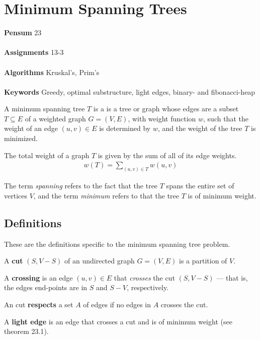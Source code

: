 
\chapter{Minimum Spanning Trees}
\label{ch:minimumspanningtrees}

\textbf{Pensum} 23 \cite{clrs} \\\\
\textbf{Assignments} 13-3 \\\\
\textbf{Algorithms} Kruskal's, Prim's\\\\
\textbf{Keywords} Greedy, optimal substructure, light edges,
binary- and fibonacci-heap
\vspace{1in}

\noindent A minimum spanning tree $T$ is a is a tree or graph whose edges are
a subset $T \subseteq E$ of a weighted graph $G = (V, E)$, with weight
function $w$, such that the weight of an edge $(u, v) \in E$ is determined by
$w$, and the weight of the tree $T$ is minimized.

The total weight of a graph $T$ is given by the sum of all of its edge weights.
\begin{align}
	w(T) = \sum_{(u, v) \in T}w(u, v)
\end{align}

The term \textit{spanning} refers to the fact that the tree $T$ spans the
entire set of vertices $V$, and the term \textit{minimum} refers to that the
tree $T$ is of minimum weight.
\section{Definitions}
These are the definitions specific to the minimum spanning tree problem.
\begin{description}
	\item A \textbf{cut} $(S, V-S)$ of an undirected graph $G = (V, E)$ is a
partition of $V$.
	\item A \textbf{crossing} is an edge $(u, v) \in E$ that \textit{crosses}
the cut $(S, V - S)$ --- that is, the edges end-points are in $S$ and $S - V$,
respectively.
	\item An cut \textbf{respects} a set $A$ of edges if no edges in $A$
crosses the cut.
	\item A \textbf{light edge} is an edge that crosses a cut and is of
minimum weight (see theorem 23.1\cite[p. 626]{clrs}).
\end{description}

